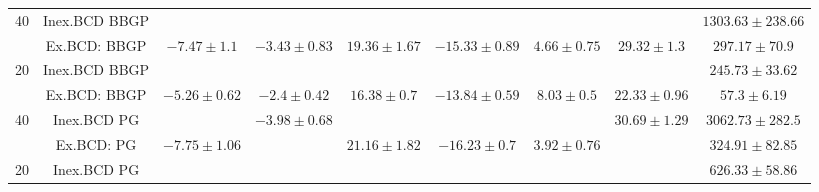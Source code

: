 \begin{table}[h]
{\begin{tabular}{|c|c|c|c|c|c|c|c|c|}
\multirow{2}{*}{40} & Inex.BCD BBGP & \cellcolor{red!10}{$-8.24\pm 1.12$} & \cellcolor{red!10}{$-3.62\pm 0.83$} & \cellcolor{red!10}{$19.57\pm 1.41$} & \cellcolor{red!10}{$-15.43\pm 0.75$} & \cellcolor{red!10}{$4.38\pm 0.66$} & \cellcolor{red!10}{$29.38\pm 0.95$} & $1303.63  \pm 238.66$ \tabularnewline
                    & Ex.BCD:  BBGP &                   {$-7.47\pm 1.1$}  &                   {$-3.43\pm 0.83$} &                   {$19.36\pm 1.67$} &                   {$-15.33\pm 0.89$} &                   {$4.66\pm 0.75$} &                   {$29.32\pm 1.3$}  & $297.17   \pm 70.9$   \tabularnewline \hline
\multirow{2}{*}{20} & Inex.BCD BBGP & \cellcolor{red!10}{$-6.88\pm 0.79$} & \cellcolor{red!10}{$-2.45\pm 0.43$} & \cellcolor{red!10}{$16.98\pm 0.85$} & \cellcolor{red!10}{$-14.13\pm 0.6$}  & \cellcolor{red!10}{$6.79\pm 0.57$} & \cellcolor{red!10}{$22.93\pm 0.73$} & $245.73   \pm 33.62$  \tabularnewline
                    & Ex.BCD:  BBGP &                   {$-5.26\pm 0.62$} &                   {$-2.4\pm 0.42$}  &                   {$16.38\pm 0.7$}  &                   {$-13.84\pm 0.59$} &                   {$8.03\pm 0.5$}  &                   {$22.33\pm 0.96$} & $57.3     \pm 6.19$   \tabularnewline \hline \hline
\multirow{2}{*}{40} & Inex.BCD PG   & \cellcolor{red!10}{$-8.23\pm 1.11$} &                   {$-3.98\pm 0.68$} & \cellcolor{red!10}{$21.53\pm 1.72$} & \cellcolor{red!10}{$-16.41\pm 0.62$} & \cellcolor{red!10}{$3.82\pm 0.67$} &                   {$30.69\pm 1.29$} & $3062.73  \pm 282.5$  \tabularnewline
                    & Ex.BCD:  PG   &                   {$-7.75\pm 1.06$} & \cellcolor{red!10}{$-4.01\pm 0.77$} &                   {$21.16\pm 1.82$} &                   {$-16.23\pm 0.7$}  &                   {$3.92\pm 0.76$} & \cellcolor{red!10}{$31\pm 1.44$}    & $324.91   \pm 82.85$  \tabularnewline \hline
\multirow{2}{*}{20} & Inex.BCD PG   & \cellcolor{red!10}{$-6.65\pm 0.71$} & \cellcolor{red!10}{$-2.97\pm 0.44$} & \cellcolor{red!10}{$17.42\pm 0.75$} & \cellcolor{red!10}{$-14.36\pm 0.54$} & \cellcolor{red!10}{$6.56\pm 0.57$} & \cellcolor{red!10}{$23.31\pm 0.85$} & $626.33   \pm 58.86$  \tabularnewline

\end{tabular}}
\end{table}
